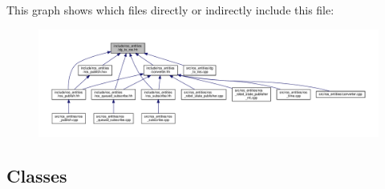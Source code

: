 This graph shows which files directly or indirectly include this file\+:
\nopagebreak
\begin{figure}[H]
\begin{center}
\leavevmode
\includegraphics[width=350pt]{dg__to__ros_8hh__dep__incl}
\end{center}
\end{figure}
\subsection*{Classes}
